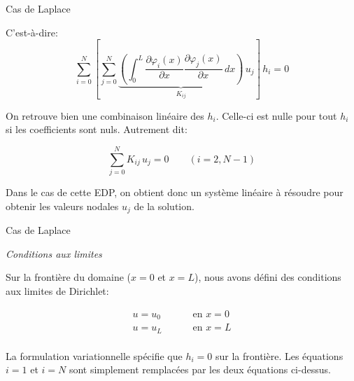 \documentclass[
mode=present,    %
paper=a4paper,   %
orient=landscape,
display=slides,   %
size=10pt,     %
style=romain   %
]{powerdot}
\begin{document}
\begin{slide}[toc=]{Cas de Laplace}


C'est-à-dire:
\begin{equation*}
    \sum_{i=0}^N \left[ \sum_{j=0}^N\underbrace{\left( \int_0^L \frac{\partial\varphi_i(x)}{\partial x}
    \frac{\partial\varphi_j(x)}{\partial x}  \, dx \right)}_{K_{ij}} \, u_j \right] \,  h_i
     = 0
\end{equation*}

\bigskip

On retrouve bien une combinaison linéaire des $h_i$. Celle-ci est nulle pour tout $h_i$ si les coefficients sont nuls. Autrement dit:

\begin{equation*}
\sum_{j=0}^N K_{ij} \, u_j = 0     \qquad (i=2,N-1)
\end{equation*}

Dans le cas de cette EDP, on obtient donc un système linéaire à résoudre pour obtenir les valeurs nodales $u_j$ de la solution.

\end{slide}


\begin{slide}[toc=]{Cas de Laplace}

\emph{Conditions aux limites}

\bigskip

Sur la frontière du domaine ($x=0$ et $x=L$), nous avons défini des conditions aux limites de Dirichlet:

\begin{equation*}
    \begin{aligned}
     u=u_0 & \qquad \text{ en } x=0 \\
     u=u_L & \qquad \text{ en } x=L \\
    \end{aligned}
\end{equation*}

\bigskip

La formulation variationnelle spécifie que $h_i=0$ sur la frontière. Les équations $i=1$ et $i=N$ sont simplement remplacées par les deux équations ci-dessus.


\end{slide}
\end{document}
